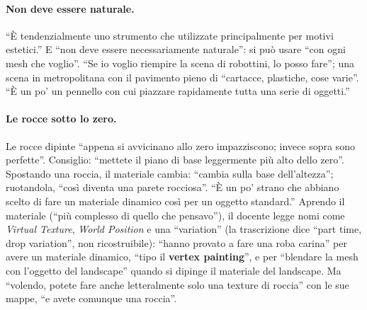 \paragraph{Non deve essere naturale.} ``È tendenzialmente uno strumento che utilizzate
principalmente per motivi estetici.'' E ``non deve essere necessariamente naturale'': si può
usare ``con ogni mesh che voglio''. ``Se io voglio riempire la scena di robottini, lo posso
fare''; una scena in metropolitana con il pavimento pieno di ``cartacce, plastiche, cose
varie''. ``È un po' un pennello con cui piazzare rapidamente tutta una serie di oggetti.''

\paragraph{Le rocce sotto lo zero.} Le rocce dipinte ``appena si avvicinano allo zero
impazziscono; invece sopra sono perfette''. Consiglio: ``mettete il piano di base leggermente
più alto dello zero''. Spostando una roccia, il materiale cambia: ``cambia sulla base
dell'altezza''; ruotandola, ``così diventa una parete rocciosa''. ``È un po' strano che abbiano
scelto di fare un materiale dinamico così per un oggetto standard.'' Aprendo il materiale
(``più complesso di quello che pensavo''), il docente legge nomi come \emph{Virtual
Texture}, \emph{World Position} e una ``variation'' (la trascrizione dice ``part time, drop
variation'', non ricostruibile): ``hanno provato a fare una roba carina'' per avere un
materiale dinamico, ``tipo il \textbf{vertex painting}'', e per ``blendare la mesh con
l'oggetto del landscape'' quando si dipinge il materiale del landscape. Ma ``volendo, potete
fare anche letteralmente solo una texture di roccia'' con le sue mappe, ``e avete comunque una
roccia''.

